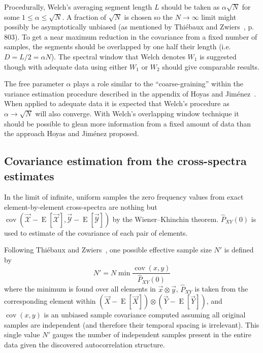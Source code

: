 \documentclass[letterpaper,11pt,nointlimits,reqno]{amsart}
\DeclareMathOperator{\cov}{cov}
\begin{document}
Procedurally, Welch's averaging segment length $L$ should be taken as
$\alpha\sqrt{N}$ for some $1\le\alpha\le\sqrt{N}$.  A fraction of $\sqrt{N}$ is
chosen so the $N\to\infty$ limit might possibly be asymptotically unbiased (as
mentioned by Thi\'{e}baux and Zwiers~\cite{Thiebaux1984Interpretation}, p.
803).  To get a near maximum reduction in the covariance from a fixed number of
samples, the segments should be overlapped by one half their length (i.e.  $D =
L / 2 = \alpha{}N$).  The spectral window that Welch denotes $W_1$ is suggested
though with adequate data using either $W_1$ or $W_2$ should give comparable
results.

The free parameter $\alpha$ plays a role similar to the ``coarse-graining''
within the variance estimation procedure described in the appendix of Hoyas and
Jim\'{e}nez~\cite{Hoyas2008Reynolds}.  When applied to adequate data it is
expected that Welch's procedure as $\alpha\to\sqrt{N}$ will also converge.
With Welch's overlapping window technique it should be possible to glean more
information from a fixed amount of data than the approach Hoyas and Jim\'{e}nez
proposed.

\subsection*{Covariance estimation from the cross-spectra estimates}

In the limit of infinite, uniform samples the zero frequency values from exact
element-by-element cross-spectra are nothing but $\cov\left( \vec{\mathscr{X}}
- \operatorname{E}\left[\vec{\mathscr{X}}\right], \vec{\mathscr{Y}} -
\operatorname{E}\left[\vec{\mathscr{Y}}\right] \right)$ by the Wiener--Khinchin
theorem.  $\hat{P}_{XY}(0)$ is used to estimate of the covariance of each pair
of elements.

Following Thi\'{e}baux and Zwiers~\cite{Thiebaux1984Interpretation},
one possible effective sample size $N'$ is defined by
$$
    N' = N \min \frac{\cov(x,y)} {\hat{P}_{XY}(0)}
$$
where the minimum is found over all elements in $\vec{x}\otimes\vec{y}$,
$\hat{P}_{XY}$ is taken from the corresponding element within $\left(\vec{X} -
\operatorname{E}\left[\vec{X}\right]\right) \otimes \left(\vec{Y} -
\operatorname{E}\left[\vec{Y}\right]\right)$, and $\cov(x,y)$ is an unbiased
sample covariance computed assuming all original samples are independent (and
therefore their temporal spacing is irrelevant).  This single value $N'$ gauges
the number of independent samples present in the entire data given the
discovered autocorrelation structure.
\end{document}
